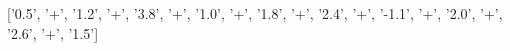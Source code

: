 \documentclass[preview]{standalone}
\begin{document}
\begin{center}
['0.5', '+', '1.2', '+', '3.8', '+', '1.0', '+', '1.8', '+', '2.4', '+', '-1.1', '+', '2.0', '+', '2.6', '+', '1.5']
\end{center}
\end{document}
